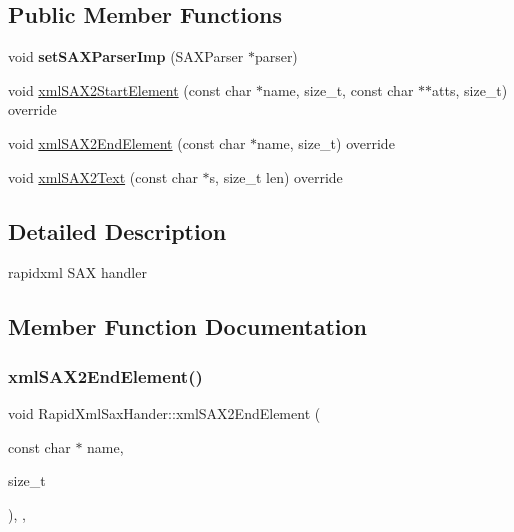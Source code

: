 \subsection*{Public Member Functions}
\begin{DoxyCompactItemize}
\item 
\mbox{\label{classRapidXmlSaxHander_ad195807845faa96e2e52afa7031b4577}} 
void {\bfseries set\+S\+A\+X\+Parser\+Imp} (S\+A\+X\+Parser $\ast$parser)
\item 
void \hyperlink{classRapidXmlSaxHander_a71e12a4c8a2c5f03b621788d3aeb884c}{xml\+S\+A\+X2\+Start\+Element} (const char $\ast$name, size\+\_\+t, const char $\ast$$\ast$atts, size\+\_\+t) override
\item 
void \hyperlink{classRapidXmlSaxHander_ab04b6c22ac059dd4c42b0500ac246246}{xml\+S\+A\+X2\+End\+Element} (const char $\ast$name, size\+\_\+t) override
\item 
void \hyperlink{classRapidXmlSaxHander_af6288a590b26853714182f507c10a66b}{xml\+S\+A\+X2\+Text} (const char $\ast$s, size\+\_\+t len) override
\end{DoxyCompactItemize}


\subsection{Detailed Description}
rapidxml S\+AX handler 

\subsection{Member Function Documentation}
\mbox{\label{classRapidXmlSaxHander_ab04b6c22ac059dd4c42b0500ac246246}} 
\subsubsection{\texorpdfstring{xml\+S\+A\+X2\+End\+Element()}{xmlSAX2EndElement()}}
{\footnotesize\ttfamily void Rapid\+Xml\+Sax\+Hander\+::xml\+S\+A\+X2\+End\+Element (\begin{DoxyParamCaption}\item[{const char $\ast$}]{name,  }\item[{size\+\_\+t}]{ }\end{DoxyParamCaption})\hspace{0.3cm}{\ttfamily [inline]}, {\ttfamily [override]}, {\ttfamily [virtual]}}

